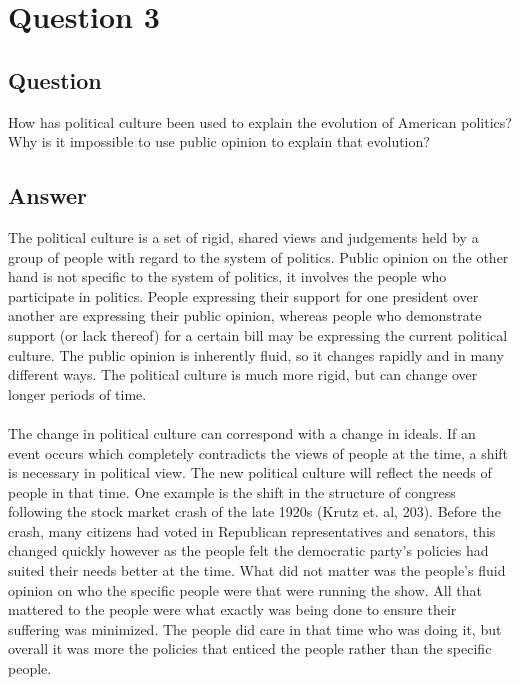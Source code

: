 \documentclass[12pt]{article}
\begin{document}
\section*{Question 3}
\subsection*{Question}
How has political culture been used to explain the evolution of American politics? Why is
it impossible to use public opinion to explain that evolution?
\subsection*{Answer}
The political culture is a set of rigid, shared views and judgements held by a group of
people with regard to the system of politics. Public opinion on the other hand is not
specific to the system of politics, it involves the people who participate in
politics. People expressing their support for one president over another are expressing
their public opinion, whereas people who demonstrate support (or lack thereof) for a
certain bill may be expressing the current political culture. The public opinion is
inherently fluid, so it changes rapidly and in many different ways. The political culture
is much more rigid, but can change over longer periods of time.
\paragraph{}
\indent The change in political culture can correspond with a change in ideals. If an
event occurs which completely contradicts the views of people at the time, a shift is
necessary in political view. The new political culture will reflect the needs of people in
that time. One example is the shift in the structure of congress following the stock
market crash of the late 1920s (Krutz et. al, 203). Before the crash, many citizens had
voted in Republican representatives and senators, this changed quickly however as the
people felt the democratic party's policies had suited their needs better at the
time. What did not matter was the people's fluid opinion on who the specific people were
that were running the show. All that mattered to the people were what exactly was being
done to ensure their suffering was minimized. The people did care in that time who was
doing it, but overall it was more the policies that enticed the people rather than the
specific people.
\end{document}
